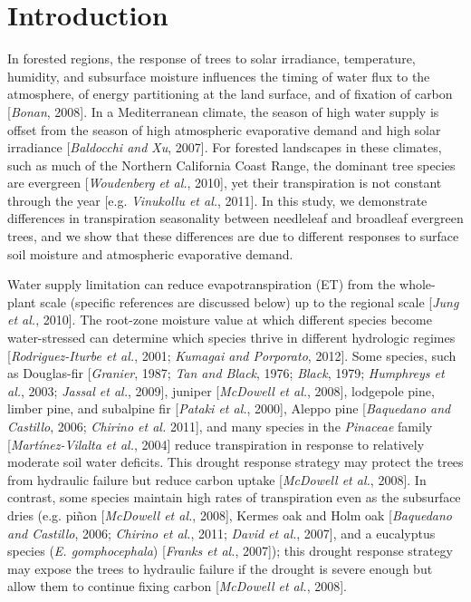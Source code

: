 \section{Introduction}
In forested regions, the response of trees to solar irradiance, temperature, humidity, and subsurface moisture influences the timing of water flux to the atmosphere, of energy partitioning at the land surface, and of fixation of carbon [\textit{Bonan}, 2008]. In a Mediterranean climate, the season of high water supply is offset from the season of high atmospheric evaporative demand and high solar irradiance [\textit{Baldocchi and Xu}, 2007]. For forested landscapes in these climates, such as much of the Northern California Coast Range, the dominant tree species are evergreen [\textit{Woudenberg et al.}, 2010], yet their transpiration is not constant through the year [e.g. \textit{Vinukollu et al.}, 2011].  In this study, we demonstrate differences in transpiration seasonality between needleleaf and broadleaf evergreen trees, and we show that these differences are due to different responses to surface soil moisture and atmospheric evaporative demand.

Water supply limitation can reduce evapotranspiration (ET) from the whole-plant scale (specific references are discussed below) up to the regional scale [\textit{Jung et al.}, 2010].  The root-zone moisture value at which different species become water-stressed can determine which species thrive in different hydrologic regimes [\textit{Rodriguez-Iturbe et al.}, 2001; \textit{Kumagai and Porporato}, 2012].  Some species, such as Douglas-fir [\textit{Granier}, 1987; \textit{Tan and Black}, 1976; \textit{Black}, 1979; \textit{Humphreys et al.}, 2003; \textit{Jassal et al.}, 2009], juniper [\textit{McDowell et al.}, 2008], lodgepole pine, limber pine, and subalpine fir [\textit{Pataki et al.}, 2000], Aleppo pine [\textit{Baquedano and Castillo}, 2006; \textit{Chirino et al.} 2011], and many species in the \textit{Pinaceae} family [\textit{Mart\'inez-Vilalta et al.}, 2004] reduce transpiration in response to relatively moderate soil water deficits.  This drought response strategy may protect the trees from hydraulic failure but reduce carbon uptake [\textit{McDowell et al.}, 2008].  In contrast, some species maintain high rates of transpiration even as the subsurface dries (e.g. pi\~non [\textit{McDowell et al.}, 2008], Kermes oak and Holm oak [\textit{Baquedano and Castillo}, 2006; \textit{Chirino et al.}, 2011; \textit{David et al.}, 2007], and a eucalyptus species (\textit{E. gomphocephala}) [\textit{Franks et al.}, 2007]); this drought response strategy may expose the trees to hydraulic failure if the drought is severe enough but allow them to continue fixing carbon [\textit{McDowell et al.}, 2008]. 

